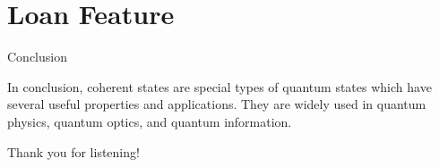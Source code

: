 \documentclass{loyola-beamer}
\begin{document}
\section{Loan Feature}

\begin{frame}{Conclusion}

	In conclusion, coherent states are special types of quantum states which have several
	useful properties and applications. They are widely used in quantum physics, quantum optics,
	and quantum information.

\end{frame}


\begin{titleframe}{Thank you for listening!}

\end{titleframe}
\end{document}
